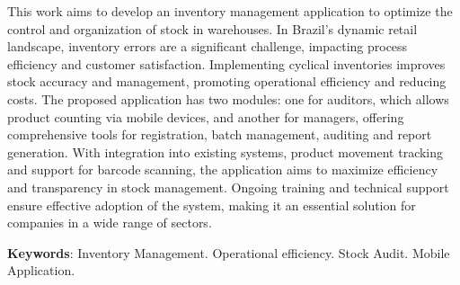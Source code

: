 This work aims to develop an inventory management application to optimize the control and organization of stock in warehouses. In Brazil’s dynamic retail landscape, inventory errors are a significant challenge, impacting process efficiency and customer satisfaction. Implementing cyclical inventories improves stock accuracy and management, promoting operational efficiency and reducing costs. The proposed application has two modules: one for auditors, which allows product counting via mobile devices, and another for managers, offering comprehensive tools for registration, batch management, auditing and report generation. With integration into existing systems, product movement tracking and support for barcode scanning, the application aims to maximize efficiency and transparency in stock management. Ongoing training and technical support ensure effective adoption of the system, making it an essential solution for companies in a wide range of sectors.

\textbf{Keywords}: Inventory Management. Operational efficiency. Stock Audit. Mobile Application.
